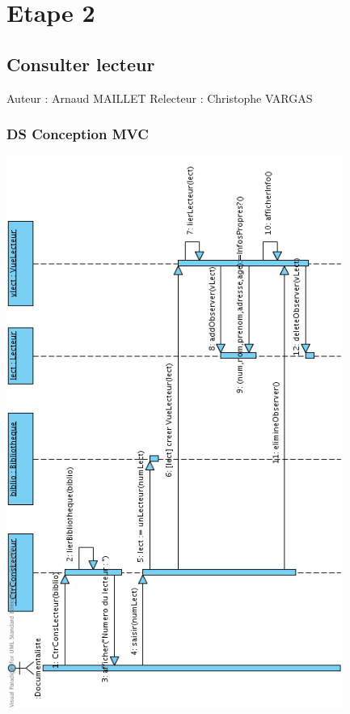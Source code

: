 \documentclass[a4paper,10pt]{report}
\begin{document}
\chapter*{Etape 2}

\section*{Consulter lecteur}

Auteur : Arnaud MAILLET
Relecteur : Christophe VARGAS

\subsection*{DS Conception MVC}

\bigskip
\includegraphics[height=180mm]{ConsLectMVC.png}
\newpage
\end{document}
